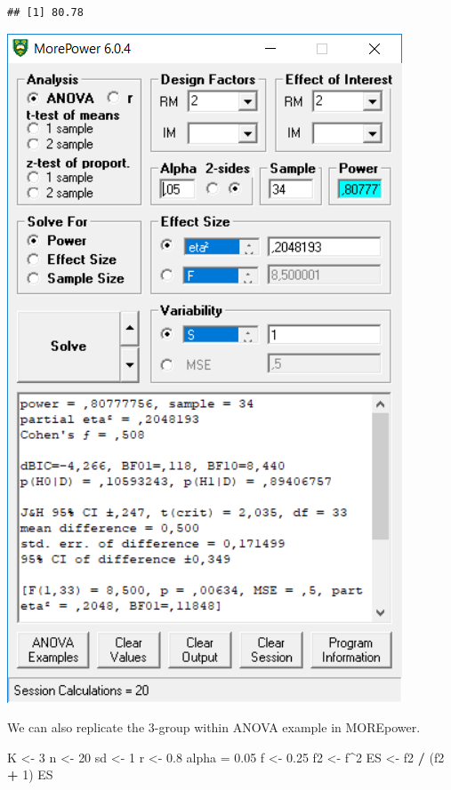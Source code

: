 \documentclass[]{book}
\newenvironment{Shaded}{\begin{snugshade}}{\end{snugshade}}
\newcommand{\DecValTok}[1]{\textcolor[rgb]{0.00,0.00,0.81}{#1}}
\newcommand{\FloatTok}[1]{\textcolor[rgb]{0.00,0.00,0.81}{#1}}
\newcommand{\NormalTok}[1]{#1}
\newcommand{\OperatorTok}[1]{\textcolor[rgb]{0.81,0.36,0.00}{\textbf{#1}}}
\newcommand{\StringTok}[1]{\textcolor[rgb]{0.31,0.60,0.02}{#1}}
\begin{document}
\begin{Shaded}
\end{Shaded}

\begin{verbatim}
## [1] 80.78
\end{verbatim}

\includegraphics{screenshots/morepower_2.png}

We can also replicate the 3-group within ANOVA example in MOREpower.

\begin{Shaded}
\begin{Highlighting}[]
\NormalTok{K <-}\StringTok{ }\DecValTok{3}
\NormalTok{n <-}\StringTok{ }\DecValTok{20}
\NormalTok{sd <-}\StringTok{ }\DecValTok{1}
\NormalTok{r <-}\StringTok{ }\FloatTok{0.8}
\NormalTok{alpha =}\StringTok{ }\FloatTok{0.05}
\NormalTok{f <-}\StringTok{ }\FloatTok{0.25}
\NormalTok{f2 <-}\StringTok{ }\NormalTok{f}\OperatorTok{^}\DecValTok{2}
\NormalTok{ES <-}\StringTok{ }\NormalTok{f2 }\OperatorTok{/}\StringTok{ }\NormalTok{(f2 }\OperatorTok{+}\StringTok{ }\DecValTok{1}\NormalTok{)}
\NormalTok{ES}
\end{Highlighting}
\end{Shaded}
\end{document}

